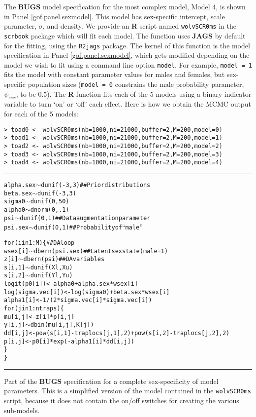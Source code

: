 {The {\bf BUGS} model specification for the
most complex model, Model 4, is shown in Panel
\ref{gof.panel.sexmodel}.  This model has sex-specific intercept,
scale parameter, $\sigma$, and density.  We provide an {\bf R} script named
\mbox{\tt wolvSCR0ms} in the \mbox{\tt scrbook} package which will fit
each model.  The function uses {\bf JAGS} by default for the fitting,
using the \mbox{\tt R2jags} package.  The kernel of this function is
the model specification in Panel \ref{gof.panel.sexmodel}, which gets
modified depending on the model we wish to fit using a command line
option \mbox{\tt model}. For example, \mbox{\tt model = 1} fits the
model with constant parameter values for males and females, but
sex-specific population sizes (\mbox{\tt model = 0} constrains the
male probability parameter, $\psi_{sex}$, to be $0.5$).  The {\bf R} function
fits each of the 5 models using a binary indicator variable to turn
`on' or `off' each effect.  Here is how we obtain the MCMC output for
each of the 5 models: {\small
\begin{verbatim}
> toad0 <- wolvSCR0ms(nb=1000,ni=21000,buffer=2,M=200,model=0)
> toad1 <- wolvSCR0ms(nb=1000,ni=21000,buffer=2,M=200,model=1)
> toad2 <- wolvSCR0ms(nb=1000,ni=21000,buffer=2,M=200,model=2)
> toad3 <- wolvSCR0ms(nb=1000,ni=21000,buffer=2,M=200,model=3)
> toad4 <- wolvSCR0ms(nb=1000,ni=21000,buffer=2,M=200,model=4)
\end{verbatim}
}



\begin{panel}[tp]
\centering
\rule[0.15in]{\textwidth}{.03in}
{\small
\begin{alltt}
alpha.sex \(\sim\) dunif(-3,3)            ## Prior distributions 
beta.sex  \(\sim\) dunif(-3,3)
sigma0 \(\sim\) dunif(0,50)
alpha0 \(\sim\) dnorm(0,.1)
psi \(\sim\) dunif(0,1)                   ## Data augmentation parameter
psi.sex  \(\sim\) dunif(0,1)              ## Probability of ``male''

for(i in 1:M)\{                      ## DA loop
  wsex[i] \(\sim\) dbern(psi.sex)         ## Latent sex state (male = 1)
  z[i] \(\sim\) dbern(psi)                ## DA variables
  s[i,1] \(\sim\) dunif(Xl,Xu)
  s[i,2] \(\sim\) dunif(Yl,Yu)
  logit(p0[i]) <- alpha0 + alpha.sex*wsex[i]
  log(sigma.vec[i]) <- log(sigma0) + beta.sex*wsex[i]
  alpha1[i] <- 1/(2*sigma.vec[i]*sigma.vec[i])
  for(j in 1:ntraps)\{
    mu[i,j] <- z[i]*p[i,j]
    y[i,j] \(\sim\) dbin(mu[i,j],K[j])
    dd[i,j] <- pow(s[i,1] - traplocs[j,1],2)  + pow(s[i,2] - traplocs[j,2],2)
    p[i,j]  <-  p0[i]*exp( - alpha1[i]*dd[i,j] )
   \}
 \}
\end{alltt}
}
\rule[-0.15in]{\textwidth}{.03in}
\caption{
Part of the {\bf BUGS} specification for a complete sex-specificity of model
parameters. This is a simplified version of the model contained in the 
\mbox{\tt wolvSCR0ms} script, because it does not contain the on/off
switches for creating the various sub-models. 
}
\label{gof.panel.sexmodel}
\end{panel}


}

